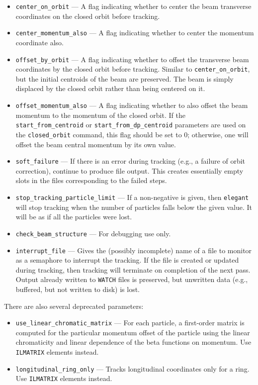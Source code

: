 \documentclass[11pt]{article}
\begin{document}
\begin{itemize}
\item \verb|center_on_orbit| --- A flag indicating whether to center
the beam transverse coordinates on the closed orbit before tracking.
\item \verb|center_momentum_also| --- A flag indicating whether to
center the momentum coordinate also.
\item \verb|offset_by_orbit| --- A flag indicating whether to offset
the transverse beam coordinates by the closed orbit before tracking.
Similar to \verb|center_on_orbit|, but the initial centroids of the
beam are preserved.  The beam is simply displaced by the closed orbit
rather than being centered on it.
\item \verb|offset_momentum_also| --- A flag indicating whether to also
offset the beam momentum to the momentum of the closed orbit.  If the
\verb|start_from_centroid| or \verb|start_from_dp_centroid| parameters are 
used on the \verb|closed_orbit| command, this flag should be set to
0; otherwise, one will offset the beam central momentum by its own value.
\item \verb|soft_failure| --- If there is an error during tracking (e.g.,
a failure of orbit correction), continue to produce file output.  This
creates essentially empty slots in the files corresponding to the failed
steps.
\item \verb|stop_tracking_particle_limit| --- If a non-negative is given, then
{\tt elegant} will stop tracking when the number of particles falls below the
given value.  It will be as if all the particles were lost.
\item \verb|check_beam_structure| --- For debugging use only.
\item \verb|interrupt_file| --- Gives the (possibly incomplete) name of a file to monitor
  as a semaphore to interrupt the tracking. If the file is created or updated during tracking, 
  then tracking will terminate on completion of the next pass.
  Output already written to \verb|WATCH| files is preserved, but unwritten data
  (e.g., buffered, but not written to disk) is lost.
\end{itemize}

There are also several deprecated parameters:
\begin{itemize}
\item \verb|use_linear_chromatic_matrix| --- For each particle, a first-order
matrix is computed for the particular momentum offset 
of the particle using the linear chromaticity and linear dependence of 
the beta functions on momentum. Use \verb|ILMATRIX| elements instead.
\item \verb|longitudinal_ring_only| --- Tracks longitudinal coordinates only
for a ring.  Use \verb|ILMATRIX| elements instead.
\end{itemize}
\end{document}

